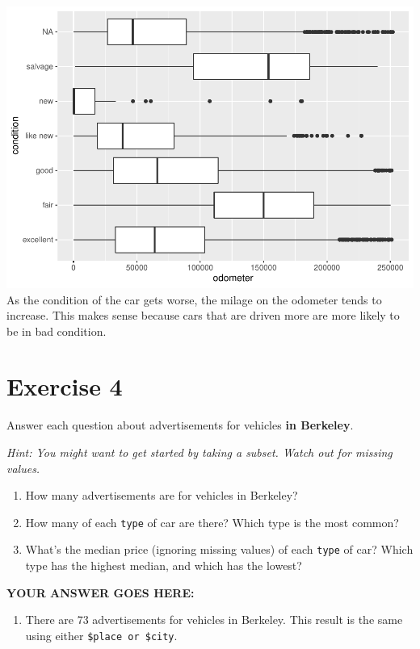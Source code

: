 \documentclass[
]{article}
\providecommand{\tightlist}{%
  \setlength{\itemsep}{0pt}\setlength{\parskip}{0pt}}
\begin{document}
\includegraphics{hw3_files/figure-latex/unnamed-chunk-6-1.pdf} As the
condition of the car gets worse, the milage on the odometer tends to
increase. This makes sense because cars that are driven more are more
likely to be in bad condition.

\hypertarget{exercise-4}{%
\section{Exercise 4}\label{exercise-4}}

Answer each question about advertisements for vehicles \textbf{in
Berkeley}.

\emph{Hint: You might want to get started by taking a subset. Watch out
for missing values.}

\begin{enumerate}
\def\labelenumi{\arabic{enumi}.}
\item
  How many advertisements are for vehicles in Berkeley?
\item
  How many of each \texttt{type} of car are there? Which type is the
  most common?
\item
  What's the median price (ignoring missing values) of each
  \texttt{type} of car? Which type has the highest median, and which has
  the lowest?
\end{enumerate}

\textbf{YOUR ANSWER GOES HERE:}

\begin{enumerate}
\def\labelenumi{\arabic{enumi}.}
\tightlist
\item
  There are 73 advertisements for vehicles in Berkeley. This result is
  the same using either \texttt{\$place\ or\ \$city}.
\end{enumerate}
\end{document}
